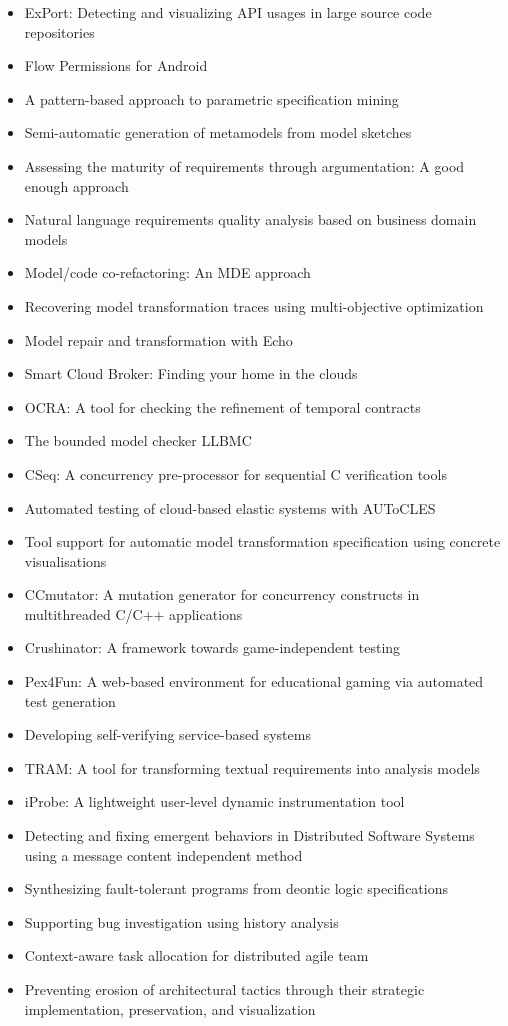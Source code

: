 {\begin{itemize}[itemsep=-1ex]
  \item ExPort: Detecting and visualizing API usages in large source code repositories
  \item Flow Permissions for Android
  \item A pattern-based approach to parametric specification mining
  \item Semi-automatic generation of metamodels from model sketches
  \item Assessing the maturity of requirements through argumentation: A good enough approach
  \item Natural language requirements quality analysis based on business domain models
  \item Model/code co-refactoring: An MDE approach
  \item Recovering model transformation traces using multi-objective optimization
  \item Model repair and transformation with Echo
  \item Smart Cloud Broker: Finding your home in the clouds
  \item OCRA: A tool for checking the refinement of temporal contracts
  \item The bounded model checker LLBMC
  \item CSeq: A concurrency pre-processor for sequential C verification tools
  \item Automated testing of cloud-based elastic systems with AUToCLES
  \item Tool support for automatic model transformation specification using concrete visualisations
  \item CCmutator: A mutation generator for concurrency constructs in multithreaded C/C++ applications
  \item Crushinator: A framework towards game-independent testing
  \item Pex4Fun: A web-based environment for educational gaming via automated test generation
  \item Developing self-verifying service-based systems
  \item TRAM: A tool for transforming textual requirements into analysis models
  \item iProbe: A lightweight user-level dynamic instrumentation tool
  \item Detecting and fixing emergent behaviors in Distributed Software Systems using a message content independent method
  \item Synthesizing fault-tolerant programs from deontic logic specifications
  \item Supporting bug investigation using history analysis
  \item Context-aware task allocation for distributed agile team
  \item Preventing erosion of architectural tactics through their strategic implementation, preservation, and visualization
\end{itemize}
}


